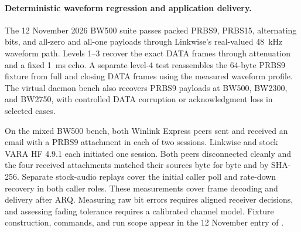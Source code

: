 \paragraph{Deterministic waveform regression and application delivery.}
The 12 November 2026 BW500 suite passes packed PRBS9, PRBS15, alternating
bits, and all-zero and all-one payloads through Linkwise's real-valued
48~kHz waveform path. Levels 1--3 recover the exact DATA frames through
attenuation and a fixed 1~ms echo. A separate level-4 test reassembles
the 64-byte PRBS9 fixture from full and closing DATA frames using the
measured waveform profile. The virtual daemon bench also recovers
PRBS9 payloads at BW500, BW2300, and BW2750, with controlled DATA
corruption or acknowledgment loss in selected cases.

On the mixed BW500 bench, both Winlink Express peers sent and received
an email with a PRBS9 attachment in each of two sessions. Linkwise and
stock VARA HF 4.9.1 each initiated one session. Both peers disconnected
cleanly and the four received attachments matched their sources byte for
byte and by SHA-256. Separate stock-audio replays cover the initial caller
poll and rate-down recovery in both caller roles. These measurements
cover frame decoding and delivery after ARQ. Measuring raw bit errors
requires aligned receiver decisions, and assessing fading tolerance
requires a calibrated channel model. Fixture construction, commands, and
run scope appear in the 12 November entry of .

